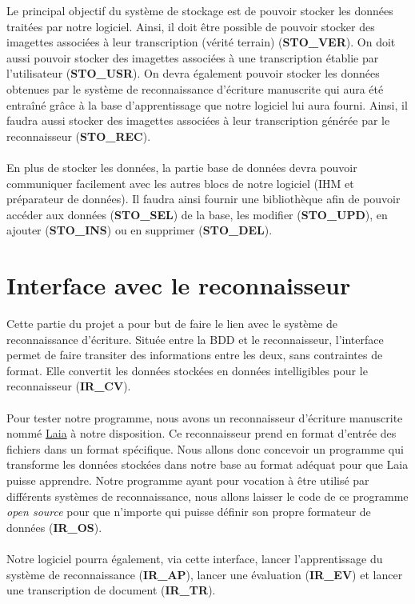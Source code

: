 Le principal objectif du système de stockage est de pouvoir stocker les données
traitées par notre logiciel. Ainsi, il doit être possible de pouvoir stocker
des imagettes associées à leur transcription (vérité terrain) (\textbf{STO\_VER}).
On doit aussi pouvoir stocker des imagettes associées à une transcription établie
par l’utilisateur (\textbf{STO\_USR}). On devra également pouvoir stocker les
données obtenues par le système de reconnaissance d’écriture manuscrite qui aura
été entraîné grâce à la base d’apprentissage que notre logiciel lui aura fourni.
Ainsi, il faudra aussi stocker des imagettes associées à leur transcription
générée par le reconnaisseur (\textbf{STO\_REC}).

\paragraph{}
En plus de stocker les données, la partie base de données devra pouvoir
communiquer facilement avec les autres blocs de notre logiciel (IHM et
préparateur de données). Il faudra ainsi fournir une bibliothèque afin 
de pouvoir accéder aux données (\textbf{STO\_SEL}) de la base, les modifier
(\textbf{STO\_UPD}), en ajouter (\textbf{STO\_INS}) ou en supprimer
(\textbf{STO\_DEL}).

\section{Interface avec le reconnaisseur}

Cette partie du projet a pour but de faire le lien avec le système de
reconnaissance d’écriture. Située entre la BDD et le reconnaisseur,
l’interface permet de faire transiter des informations entre les deux, sans
contraintes de format. Elle convertit les données stockées en données
intelligibles pour le reconnaisseur (\textbf{IR\_CV}).

\paragraph{}
Pour tester notre programme, nous avons un reconnaisseur d’écriture
manuscrite nommé
\href{https://github.com/jpuigcerver/Laia/tree/master/egs/iam}{Laia} à notre
disposition. Ce reconnaisseur prend en format d’entrée des fichiers dans un
format spécifique. Nous allons donc concevoir un programme qui transforme les
données stockées dans notre base au format adéquat pour que Laia puisse
apprendre. Notre programme ayant pour vocation à être utilisé par différents
systèmes de reconnaissance, nous allons laisser le code de ce programme
\textit{open source} pour que n’importe qui puisse définir son propre
formateur de données (\textbf{IR\_OS}).

\paragraph{}
Notre logiciel pourra également, via cette interface, lancer
l’apprentissage du système de reconnaissance (\textbf{IR\_AP}), lancer une
évaluation (\textbf{IR\_EV}) et lancer une transcription de document
(\textbf{IR\_TR}).
